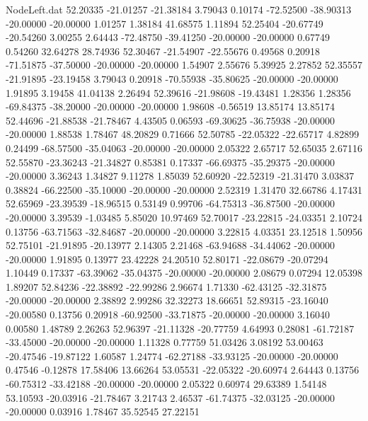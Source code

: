 \begin{filecontents}{NodeLeft.dat}
  52.20335  -21.01257  -21.38184     3.79043    0.10174  -72.52500  -38.90313  -20.00000  -20.00000    1.01257    1.38184   41.68575    1.11894
  52.25404  -20.67749  -20.54260     3.00255    2.64443  -72.48750  -39.41250  -20.00000  -20.00000    0.67749    0.54260   32.64278   28.74936
  52.30467  -21.54907  -22.55676     0.49568    0.20918  -71.51875  -37.50000  -20.00000  -20.00000    1.54907    2.55676    5.39925    2.27852
  52.35557  -21.91895  -23.19458     3.79043    0.20918  -70.55938  -35.80625  -20.00000  -20.00000    1.91895    3.19458   41.04138    2.26494
  52.39616  -21.98608  -19.43481     1.28356    1.28356  -69.84375  -38.20000  -20.00000  -20.00000    1.98608   -0.56519   13.85174   13.85174
  52.44696  -21.88538  -21.78467     4.43505    0.06593  -69.30625  -36.75938  -20.00000  -20.00000    1.88538    1.78467   48.20829    0.71666
  52.50785  -22.05322  -22.65717     4.82899    0.24499  -68.57500  -35.04063  -20.00000  -20.00000    2.05322    2.65717   52.65035    2.67116
  52.55870  -23.36243  -21.34827     0.85381    0.17337  -66.69375  -35.29375  -20.00000  -20.00000    3.36243    1.34827    9.11278    1.85039
  52.60920  -22.52319  -21.31470     3.03837    0.38824  -66.22500  -35.10000  -20.00000  -20.00000    2.52319    1.31470   32.66786    4.17431
  52.65969  -23.39539  -18.96515     0.53149    0.99706  -64.75313  -36.87500  -20.00000  -20.00000    3.39539   -1.03485    5.85020   10.97469
  52.70017  -23.22815  -24.03351     2.10724    0.13756  -63.71563  -32.84687  -20.00000  -20.00000    3.22815    4.03351   23.12518    1.50956
  52.75101  -21.91895  -20.13977     2.14305    2.21468  -63.94688  -34.44062  -20.00000  -20.00000    1.91895    0.13977   23.42228   24.20510
  52.80171  -22.08679  -20.07294     1.10449    0.17337  -63.39062  -35.04375  -20.00000  -20.00000    2.08679    0.07294   12.05398    1.89207
  52.84236  -22.38892  -22.99286     2.96674    1.71330  -62.43125  -32.31875  -20.00000  -20.00000    2.38892    2.99286   32.32273   18.66651
  52.89315  -23.16040  -20.00580     0.13756    0.20918  -60.92500  -33.71875  -20.00000  -20.00000    3.16040    0.00580    1.48789    2.26263
  52.96397  -21.11328  -20.77759     4.64993    0.28081  -61.72187  -33.45000  -20.00000  -20.00000    1.11328    0.77759   51.03426    3.08192
  53.00463  -20.47546  -19.87122     1.60587    1.24774  -62.27188  -33.93125  -20.00000  -20.00000    0.47546   -0.12878   17.58406   13.66264
  53.05531  -22.05322  -20.60974     2.64443    0.13756  -60.75312  -33.42188  -20.00000  -20.00000    2.05322    0.60974   29.63389    1.54148
  53.10593  -20.03916  -21.78467     3.21743    2.46537  -61.74375  -32.03125  -20.00000  -20.00000    0.03916    1.78467   35.52545   27.22151

\end{filecontents}
